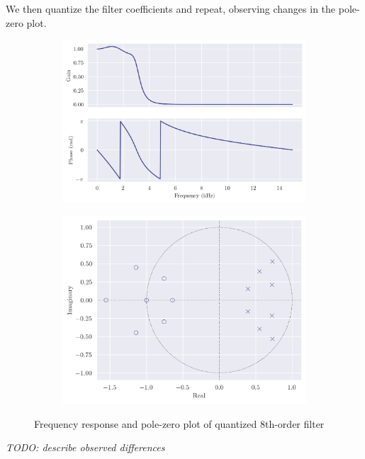 We then quantize the filter coefficients and repeat, observing changes in the pole-zero plot.

\begin{figure}[!ht]
    \centering
    \begin{subfigure}[b]{0.58\textwidth}
        \centering
        \includegraphics[width=\textwidth]{images/q8_q8th_freqz.png}
    \end{subfigure}
    \hfill
    \begin{subfigure}[b]{0.41\textwidth}
        \centering
        \includegraphics[width=\textwidth]{images/q8_q8th_zp.png}
    \end{subfigure}
    \caption{Frequency response and pole-zero plot of quantized 8th-order filter}
\end{figure}

\textit{TODO: describe observed differences}
